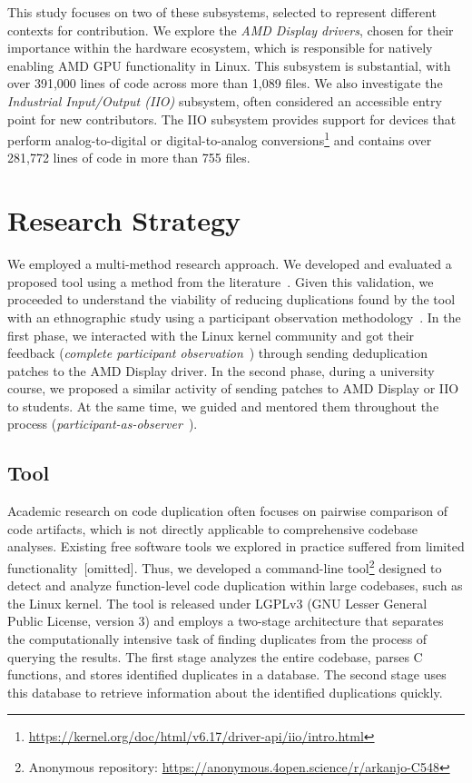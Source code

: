 \documentclass[10pt,conference]{IEEEtran}
\begin{document}
This study focuses on two of these subsystems, selected to represent different contexts for contribution. We explore the \textit{AMD Display drivers}, chosen for their importance within the hardware ecosystem, which is responsible for natively enabling AMD GPU functionality in Linux. This subsystem is substantial, with over 391,000 lines of code across more than 1,089 files. We also investigate the \textit{Industrial Input/Output (IIO)} subsystem, often considered an accessible entry point for new contributors. The IIO subsystem provides support for devices that perform analog-to-digital or digital-to-analog conversions\footnote{\href{https://kernel.org/doc/html/v6.17/driver-api/iio/intro.html}{https://kernel.org/doc/html/v6.17/driver-api/iio/intro.html}} and contains over 281,772 lines of code in more than 755 files.

\section{Research Strategy}

We employed a multi-method research approach. We developed and evaluated a proposed tool using a method from the literature~\cite{bigclonebench}. Given this validation, we proceeded to understand the viability of reducing duplications found by the tool with an ethnographic study using a participant observation methodology~\cite{gold1958roles}. In the first phase, we interacted with the Linux kernel community and got their feedback (\textit{complete participant observation}~\cite{gold1958roles}) through sending deduplication patches to the AMD Display driver. In the second phase, during a university course, we proposed a similar activity of sending patches to AMD Display or IIO to students. At the same time, we guided and mentored them throughout the process (\textit{participant-as-observer}~\cite{gold1958roles}).

\subsection{Tool}

Academic research on code duplication often focuses on pairwise comparison of code artifacts, which is not directly applicable to comprehensive codebase analyses. Existing free software tools we explored in practice suffered from limited functionality~[omitted]. Thus, we developed a command-line tool\footnote{Anonymous repository:  \url{https://anonymous.4open.science/r/arkanjo-C548}} designed to detect and analyze function-level code duplication within large codebases, such as the Linux kernel. The tool is released under LGPLv3 (GNU Lesser General Public License, version 3) and employs a two-stage architecture that separates the computationally intensive task of finding duplicates from the process of querying the results. The first stage analyzes the entire codebase, parses C functions, and stores identified duplicates in a database. The second stage uses this database to retrieve information about the identified duplications quickly.
\end{document}
